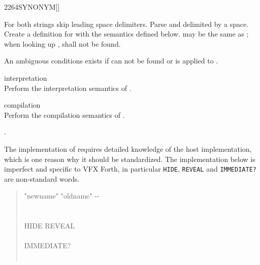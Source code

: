 \begin{worddef}{2264}{SYNONYM}[]%
\item {}

	For both strings skip leading space delimiters.  Parse 
	and  delimited by a space.  Create a definition for
	 with the semantics defined below.
	 may be the same as ;
	when looking up ,  shall not be found.

	An ambiguous conditions exists if  can not be found or
	 is applied to .

\item[\param{newname} interpretation]
	 \\
	Perform the interpretation semantics of .

\item[\param{newname} compilation]
	 \\
	Perform the compilation semantics of .

\see {}.

	\begin{implement} %
		\dffamily
		The implementation of  requires detailed knowledge
		of the host implementation, which is one reason why it should be
		standardized.  The implementation below is imperfect and specific
		to VFX Forth, in particular \texttt{HIDE}, \texttt{REVEAL} and
		\texttt{IMMEDIATE?} are non-standard words.

		\begin{quote}\ttfamily
			\word{:}   "newname" "oldname" -{-} \\
			  \\
			\tab {}  \\
			\tab[2] HIDE  \word{,} REVEAL \\
			\tab {} \\
			\tab[2]       IMMEDIATE?  \\
			\tab[2]      \\
			\word{;}
		\end{quote}
		\vspace*{-1ex}
	\end{implement}
\end{worddef}

